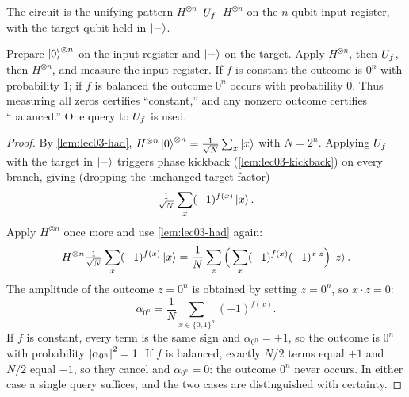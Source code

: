 The circuit is the unifying pattern $H^{\otimes n}$--$U_{f}$--$H^{\otimes n}$ on the
$n$-qubit input register, with the target qubit held in $\ket{-}$.

\begin{theorem}
\label{thm:lec03-dj}
Prepare $\ket{0}^{\otimes n}$ on the input register and $\ket{-}$ on the target.
Apply $H^{\otimes n}$, then $U_{f}$, then $H^{\otimes n}$, and measure the input
register. If $f$ is constant the outcome is $0^n$ with probability $1$; if $f$ is
balanced the outcome $0^n$ occurs with probability $0$. Thus measuring all zeros
certifies ``constant,'' and any nonzero outcome certifies ``balanced.'' One query
to $U_{f}$ is used.
\end{theorem}

\begin{proof}
By \cref{lem:lec03-had}, $H^{\otimes n}\ket{0}^{\otimes n}
=\tfrac{1}{\sqrt N}\sum_{x}\ket{x}$ with $N=2^n$. Applying $U_{f}$ with the target
in $\ket{-}$ triggers phase kickback (\cref{lem:lec03-kickback}) on every branch,
giving (dropping the unchanged target factor)
\[
  \tfrac{1}{\sqrt N}\sum_{x}(-1)^{f(x)}\ket{x}.
\]
Apply $H^{\otimes n}$ once more and use \cref{lem:lec03-had} again:
\[
  H^{\otimes n}\tfrac{1}{\sqrt N}\sum_{x}(-1)^{f(x)}\ket{x}
  =\frac{1}{N}\sum_{z}\Big(\sum_{x}(-1)^{f(x)}(-1)^{x\cdot z}\Big)\ket{z}.
\]
The amplitude of the outcome $z=0^n$ is obtained by setting $z=0^n$, so $x\cdot z=0$:
\[
  \alpha_{0^n}=\frac{1}{N}\sum_{x\in\{0,1\}^n}(-1)^{f(x)}.
\]
If $f$ is constant, every term is the same sign and $\alpha_{0^n}=\pm1$, so the
outcome is $0^n$ with probability $\left\lvert \alpha_{0^n} \right\rvert^2=1$. If $f$ is balanced,
exactly $N/2$ terms equal $+1$ and $N/2$ equal $-1$, so they cancel and
$\alpha_{0^n}=0$: the outcome $0^n$ never occurs. In either case a single query
suffices, and the two cases are distinguished with certainty.
\end{proof}

